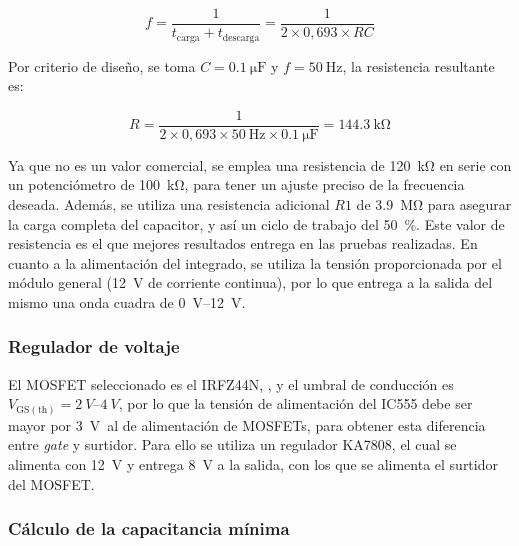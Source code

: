 \begin{equation}
f = \frac{1}{t_\mathrm{carga} + t_\mathrm{descarga}} = \frac{1}{2 \times 0{,}693 \times RC}
\label{eq:inversor:frecuencia}
\end{equation}

Por criterio de diseño, se toma \(C = \SI{0.1}{\micro\farad}\) y \(f = \SI{50}{\hertz}\), la resistencia resultante es:

\begin{equation}
R = \frac{1}{2 \times 0{,}693 \times \SI{50}{\hertz} \times \SI{0.1}{\micro\farad}} = \SI{144.3}{\kilo\ohm}
\label{eq:inversor:resistencia_frecuencia}
\end{equation}

Ya que no es un valor comercial, se emplea una resistencia de \SI{120}{\kilo\ohm} en serie con un potenciómetro de \SI{100}{\kilo\ohm}, para tener un ajuste preciso de la frecuencia deseada.
Además, se utiliza una resistencia adicional \(R{1}\) de \SI{3,9}{\mega\ohm} para asegurar la carga completa del capacitor, y así un ciclo de trabajo del \SI{50}{\percent}. Este valor de resistencia es el que mejores resultados entrega en las pruebas realizadas.
En cuanto a la alimentación del integrado, se utiliza la tensión proporcionada por el módulo general (\SI{12}{\volt} de corriente continua), por lo que entrega a la salida del mismo una onda cuadra de \SIrange{0}{12}{\volt}.

\subsubsection{Regulador de voltaje}

El MOSFET seleccionado es el IRFZ44N, \parencite{IRFZ44N}, y el umbral de conducción es \(V_\mathrm{GS(th)} = \SIrange{2}{4}{V}\), por lo que la tensión de alimentación del IC555 debe ser mayor por \SI{3}{\volt}\ al de alimentación de MOSFETs, para obtener esta diferencia entre \textit{gate} y surtidor. Para ello se utiliza un regulador KA7808, el cual se alimenta con \SI{12}{V} y entrega \SI{8}{V} a la salida, con los que se alimenta el surtidor del MOSFET.

\subsubsection{Cálculo de la capacitancia mínima}

